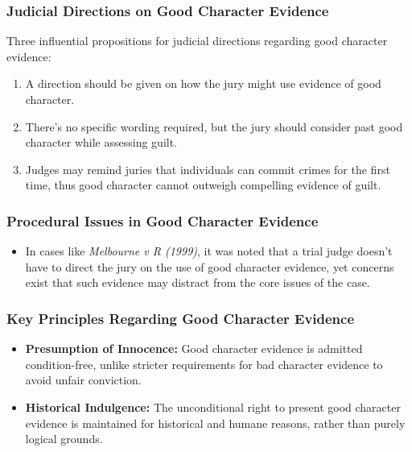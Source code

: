 \subsubsection{Judicial Directions on Good Character
Evidence}\label{judicial-directions-on-good-character-evidence}

Three influential propositions for judicial directions regarding good
character evidence:

\begin{enumerate}
\def\labelenumi{\arabic{enumi}.}
\tightlist
\item
  A direction should be given on how the jury might use evidence of good
  character.
\item
  There's no specific wording required, but the jury should consider
  past good character while assessing guilt.
\item
  Judges may remind juries that individuals can commit crimes for the
  first time, thus good character cannot outweigh compelling evidence of
  guilt.
\end{enumerate}

\subsubsection{Procedural Issues in Good Character
Evidence}\label{procedural-issues-in-good-character-evidence}

\begin{itemize}
\tightlist
\item
  In cases like \emph{Melbourne v R (1999)}, it was noted that a trial
  judge doesn't have to direct the jury on the use of good character
  evidence, yet concerns exist that such evidence may distract from the
  core issues of the case.
\end{itemize}

\subsubsection{Key Principles Regarding Good Character
Evidence}\label{key-principles-regarding-good-character-evidence}

\begin{itemize}
\tightlist
\item
  \textbf{Presumption of Innocence:} Good character evidence is admitted
  condition-free, unlike stricter requirements for bad character
  evidence to avoid unfair conviction.
\item
  \textbf{Historical Indulgence:} The unconditional right to present
  good character evidence is maintained for historical and humane
  reasons, rather than purely logical grounds.
\end{itemize}

